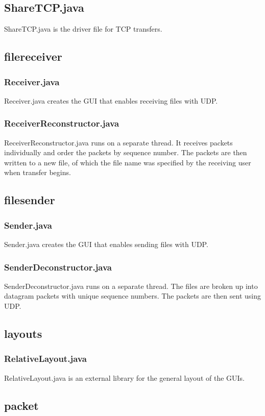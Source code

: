 \documentclass[a4paper,10pt]{article}
\begin{document}
\subsection{ShareTCP.java}
ShareTCP.java is the driver file for TCP transfers.

\subsection{filereceiver}
\subsubsection{Receiver.java}
Receiver.java creates the GUI that enables receiving files with UDP.
\subsubsection{ReceiverReconstructor.java}
ReceiverReconstructor.java runs on a separate thread. It receives packets
individually and order the packets by sequence number.
The packets are then written to a new file, of which the file name was
specified by the receiving user when transfer begins.

\subsection{filesender}
\subsubsection{Sender.java}
Sender.java creates the GUI that enables sending files with UDP.
\subsubsection{SenderDeconstructor.java}
SenderDeconstructor.java runs on a separate thread. The files are broken up
into datagram packets with unique sequence numbers. The packets are then sent
using UDP.

\subsection{layouts}
\subsubsection{RelativeLayout.java}
RelativeLayout.java is an external library for the general layout of the GUIs.

\subsection{packet}
\end{document}
